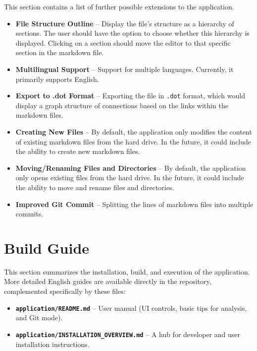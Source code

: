 \documentclass[12pt, a4paper]{article}
\begin{document}
This section contains a list of further possible extensions to the application.

\begin{itemize}
    \item \textbf{File Structure Outline} -- Display the file's structure as a hierarchy of sections. 
    The user should have the option to choose whether this hierarchy is displayed. Clicking on a section 
    should move the editor to that specific section in the markdown file.
    \item \textbf{Multilingual Support} -- Support for multiple languages. Currently, it primarily supports English.
    \item \textbf{Export to .dot Format} -- Exporting the file in \texttt{.dot} format, 
    which would display a graph structure of connections based on the links within the markdown files.
    \item \textbf{Creating New Files} -- By default, the application only modifies the 
    content of existing markdown files from the hard drive. In the future, it could include 
    the ability to create new markdown files.
    \item \textbf{Moving/Renaming Files and Directories} -- By default, the application only 
    opens existing files from the hard drive. In the future, it could include the ability to
     move and rename files and directories.
    \item \textbf{Improved Git Commit} -- Splitting the lines of markdown files into multiple commits.
\end{itemize}

\section{Build Guide}

This section summarizes the installation, build, and execution of the application. 
More detailed English guides are available directly in the repository, complemented specifically by these files:

\begin{itemize}
    \item \textbf{\texttt{application/README.md}} -- User manual (UI controls, basic tips for analysis, and Git mode).
    \item \textbf{\texttt{application/INSTALLATION\_OVERVIEW.md}} -- A hub for developer and user installation instructions.
\end{itemize}
\end{document}
